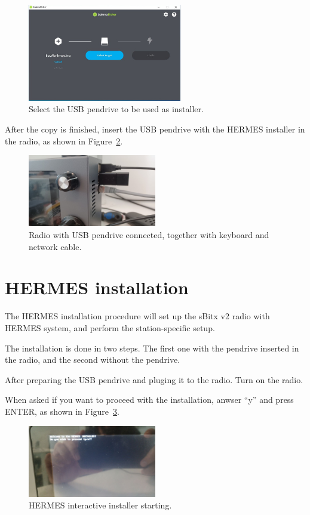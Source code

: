 \documentclass[11pt,a4paper]{article}
\begin{document}
\begin{figure}[H]
  \centering
  \includegraphics[width=0.6\textwidth]{pictures/balena-4-ed.jpg}
  \caption{Select the USB pendrive to be used as installer.}
  \label{fig:balena4}
\end{figure}

After the copy is finished, insert the USB pendrive with the HERMES installer in the radio, as shown in Figure~\ref{fig:pen1}.

\begin{figure}[H]
  \centering
  \includegraphics[width=0.5\textwidth]{pictures/usb-1.jpeg}
  \caption{Radio with USB pendrive connected, together with keyboard and network cable.}
  \label{fig:pen1}
\end{figure}


\section{HERMES installation}

The HERMES installation procedure will set up the sBitx v2 radio with HERMES system,
and perform the station-specific setup.

The installation is done in two steps. The first one with the
pendrive inserted in the radio, and the second without the pendrive.

After preparing the USB pendrive and pluging it to the radio. Turn on the radio.

When asked if you want to proceed with the installation, anwser ``y'' and press ENTER, as shown in Figure~\ref{fig:inst1}.

\begin{figure}[H]
  \centering
  \includegraphics[width=0.5\textwidth]{pictures/inst-1.jpg}
  \caption{HERMES interactive installer starting.}
  \label{fig:inst1}
\end{figure}
\end{document}
